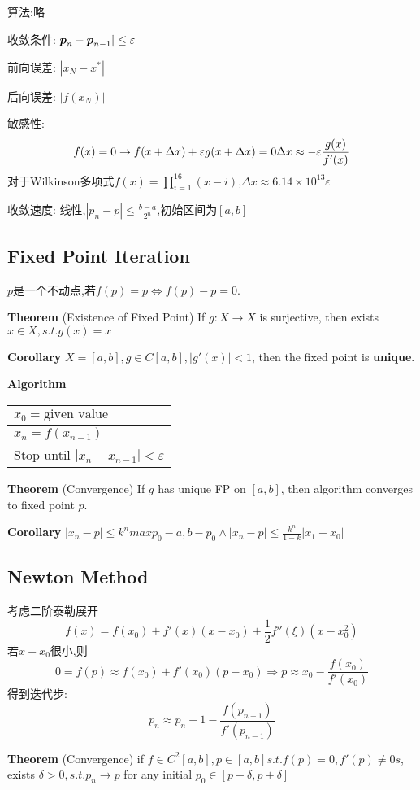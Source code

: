 \documentclass{article}
\begin{document}
算法:略

收敛条件:$|\boldsymbol{p}_n-\boldsymbol{p}_{n-1}|\le \varepsilon$

前向误差: $|x_N-x^*|$

后向误差: $|f(x_N)|$

敏感性:
$$
    f(x)=0\rightarrow f(x+\Delta x)+\varepsilon g(x+\Delta x)=0\\
    \Delta x \approx -\varepsilon \frac{g(x)}{f'(x)}
$$
对于Wilkinson多项式$f(x)=\prod_{i=1}^16(x-i)$,$\Delta x\approx 6.14\times 10^13 \varepsilon$

收敛速度: 线性,$|p_n-p|\le \frac{b-a}{2^n}$,初始区间为$[a,b]$

\subsection{Fixed Point Iteration}

$p$是一个不动点,若$f(p)=p \Leftrightarrow f(p)-p=0$.

\textbf{Theorem} (Existence of Fixed Point) If $g: X\rightarrow X$ is surjective, then exists $x\in X, s.t. g(x)=x$

\textbf{Corollary} $X=[a, b], g\in C[a, b], |g'(x)|<1$, then the fixed point is \textbf{unique}.

\textbf{Algorithm} \\
\begin{tabular}{l}
    $x_0=\text{given value}$ \\
    \hline
    $x_n=f(x_{n-1})$         \\
    \hline
    Stop until $|x_n-x_{n-1}|<\varepsilon$
\end{tabular}

\textbf{Theorem} (Convergence) If $g$ has unique FP on $[a,b]$, then algorithm converges to fixed point $p$.

\textbf{Corollary} $|x_n-p|\le k^n max{p_0-a,b-p_0}\wedge |x_n-p|\le \frac{k^n}{1-k}|x_1-x_0|$

\subsection{Newton Method}

考虑二阶泰勒展开
$$f(x)=f(x_0)+f'(x)(x-x_0)+\frac{1}{2}f''(\xi)(x-x_0^2)$$
若$x-x_0$很小,则
$$
    0=f(p)\approx f(x_0) +f'(x_0)(p-x_0)\Rightarrow p\approx x_0-\frac{f(x_0)}{f'(x_0)}
$$
得到迭代步:
$$p_n\approx p_n-1-\frac{f(p_{n-1})}{f'(p_{n-1})}$$

\textbf{Theorem} (Convergence) if $f\in C^2[a,b],p\in[a,b] s.t. f(p)=0,f'(p)\neq 0 s$, exists $\delta>0, s.t. p_n\rightarrow p$ for any initial $p_0\in [p-\delta, p+\delta]$
\end{document}

